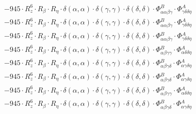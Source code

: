 \documentclass{article}
\begin{document}
\begin{subequations}
\begin{gather}
\begin{array}{c}
 \\[0.2em] 		 - 945 \cdot R_{z}^{6} \cdot R_{\beta{}} \cdot R_{\eta{}} \cdot \delta{}\left(\alpha{}, \alpha{}\right) \cdot \delta{}\left(\gamma{}, \gamma{}\right) \cdot \delta{}\left(\delta{}, \delta{}\right) \cdot \Phi{}^{B}_{\alpha{}\alpha{}\beta{}\gamma{}} \cdot \Phi{}^{A}_{\gamma{}\delta{}\delta{}\eta{}} 
 \\[0.2em] 		 - 945 \cdot R_{z}^{6} \cdot R_{\beta{}} \cdot R_{\eta{}} \cdot \delta{}\left(\alpha{}, \alpha{}\right) \cdot \delta{}\left(\gamma{}, \gamma{}\right) \cdot \delta{}\left(\delta{}, \delta{}\right) \cdot \Phi{}^{B}_{\alpha{}\alpha{}\beta{}\gamma{}} \cdot \Phi{}^{A}_{\gamma{}\delta{}\delta{}\eta{}} 
 \\[0.2em] 		 - 945 \cdot R_{z}^{6} \cdot R_{\beta{}} \cdot R_{\eta{}} \cdot \delta{}\left(\alpha{}, \alpha{}\right) \cdot \delta{}\left(\gamma{}, \gamma{}\right) \cdot \delta{}\left(\delta{}, \delta{}\right) \cdot \Phi{}^{B}_{\alpha{}\alpha{}\beta{}\gamma{}} \cdot \Phi{}^{A}_{\gamma{}\delta{}\delta{}\eta{}} 
 \\[0.2em] 		 - 945 \cdot R_{z}^{6} \cdot R_{\beta{}} \cdot R_{\eta{}} \cdot \delta{}\left(\alpha{}, \alpha{}\right) \cdot \delta{}\left(\gamma{}, \gamma{}\right) \cdot \delta{}\left(\delta{}, \delta{}\right) \cdot \Phi{}^{B}_{\alpha{}\beta{}\gamma{}\gamma{}} \cdot \Phi{}^{A}_{\alpha{}\delta{}\delta{}\eta{}} 
 \\[0.2em] 		 - 945 \cdot R_{z}^{6} \cdot R_{\beta{}} \cdot R_{\eta{}} \cdot \delta{}\left(\alpha{}, \alpha{}\right) \cdot \delta{}\left(\gamma{}, \gamma{}\right) \cdot \delta{}\left(\delta{}, \delta{}\right) \cdot \Phi{}^{B}_{\alpha{}\beta{}\gamma{}\delta{}} \cdot \Phi{}^{A}_{\alpha{}\gamma{}\delta{}\eta{}} 
 \\[0.2em] 		 - 945 \cdot R_{z}^{6} \cdot R_{\beta{}} \cdot R_{\eta{}} \cdot \delta{}\left(\alpha{}, \alpha{}\right) \cdot \delta{}\left(\gamma{}, \gamma{}\right) \cdot \delta{}\left(\delta{}, \delta{}\right) \cdot \Phi{}^{B}_{\alpha{}\beta{}\gamma{}\delta{}} \cdot \Phi{}^{A}_{\alpha{}\gamma{}\delta{}\eta{}} 
 \\[0.2em] 		 - 945 \cdot R_{z}^{6} \cdot R_{\beta{}} \cdot R_{\eta{}} \cdot \delta{}\left(\alpha{}, \alpha{}\right) \cdot \delta{}\left(\gamma{}, \gamma{}\right) \cdot \delta{}\left(\delta{}, \delta{}\right) \cdot \Phi{}^{B}_{\alpha{}\beta{}\gamma{}\gamma{}} \cdot \Phi{}^{A}_{\alpha{}\delta{}\delta{}\eta{}} 
 \\[0.2em] 		 - 945 \cdot R_{z}^{6} \cdot R_{\beta{}} \cdot R_{\eta{}} \cdot \delta{}\left(\alpha{}, \alpha{}\right) \cdot \delta{}\left(\gamma{}, \gamma{}\right) \cdot \delta{}\left(\delta{}, \delta{}\right) \cdot \Phi{}^{B}_{\alpha{}\beta{}\gamma{}\delta{}} \cdot \Phi{}^{A}_{\alpha{}\gamma{}\delta{}\eta{}} 

\end{array}
\end{gather}
\end{subequations}
\end{document}
